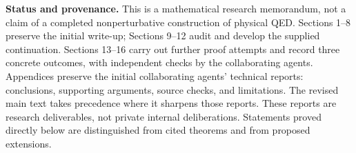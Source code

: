 \documentclass[11pt,letterpaper]{article}
\numberwithin{equation}{section}
\theoremstyle{remark}
\begin{document}
\noindent\textbf{Status and provenance.}
This is a mathematical research memorandum, not a claim of a completed
nonperturbative construction of physical QED. Sections 1--8 preserve the
initial write-up; Sections 9--12 audit and develop the supplied continuation.
Sections 13--16 carry out further proof attempts and record three concrete
outcomes, with independent checks by the collaborating agents.
Appendices preserve the initial collaborating agents' technical
reports: conclusions, supporting arguments, source checks, and limitations.
The revised main text takes precedence where it sharpens those reports.
These reports are research deliverables, not private internal deliberations.
Statements proved directly below are distinguished from cited theorems and
from proposed extensions.
\clearpage
\begingroup
\small
\setlength{\parskip}{0pt}
\tableofcontents
\endgroup
\clearpage

\clearpage

\clearpage




\clearpage

\clearpage
\appendix

\clearpage

\clearpage

\end{document}
